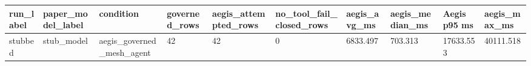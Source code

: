 \begin{tabular}{llllllllll}
 \hline
run\_label & paper\_model\_label & condition & governed\_rows & aegis\_attempted\_rows & no\_tool\_fail\_closed\_rows & aegis\_avg\_ms & aegis\_median\_ms & Aegis p95 ms & aegis\_max\_ms \\
 \hline
stubbed & stub\_model & aegis\_governed\_mesh\_agent & 42 & 42 & 0 & 6833.497 & 703.313 & 17633.553 & 40111.518 \\
 \hline
\end{tabular}
